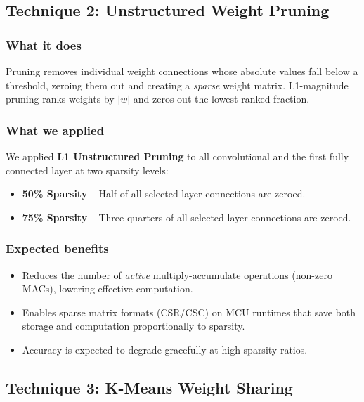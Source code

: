 \documentclass[12pt,a4paper]{article}
\begin{document}
\subsection{Technique 2: Unstructured Weight Pruning}

\subsubsection{What it does}
Pruning removes individual weight connections whose absolute values fall below
a threshold, zeroing them out and creating a \textit{sparse} weight matrix.
L1-magnitude pruning ranks weights by $|w|$ and zeros out the lowest-ranked
fraction.

\subsubsection{What we applied}
We applied \textbf{L1 Unstructured Pruning} to all convolutional and the first
fully connected layer at two sparsity levels:
\begin{itemize}
  \item \textbf{50\% Sparsity} -- Half of all selected-layer connections are
        zeroed.
  \item \textbf{75\% Sparsity} -- Three-quarters of all selected-layer
        connections are zeroed.
\end{itemize}

\subsubsection{Expected benefits}
\begin{itemize}
  \item Reduces the number of \textit{active} multiply-accumulate operations
        (non-zero MACs), lowering effective computation.
  \item Enables sparse matrix formats (CSR/CSC) on MCU runtimes that save
        both storage and computation proportionally to sparsity.
  \item Accuracy is expected to degrade gracefully at high sparsity ratios.
\end{itemize}

\subsection{Technique 3: K-Means Weight Sharing}
\end{document}
